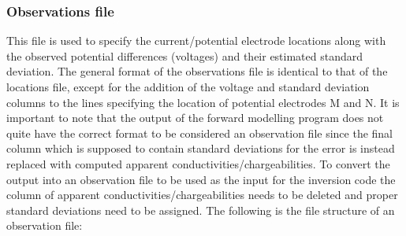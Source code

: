 \subsubsection{Observations file}
This file is used to specify the current/potential electrode locations along with the observed potential differences (voltages) and their estimated standard deviation. The general format of the observations file is identical to that of the locations file, except for the addition of the voltage and standard deviation columns to the lines specifying the location of potential electrodes M and N. It is important to note that the output of the forward modelling program  does not quite have the correct format to be considered an observation file since the final column which is supposed to contain standard deviations for the error is instead replaced with computed apparent conductivities/chargeabilities. To convert the  output into an observation file to be used as the input for the inversion code the column of apparent conductivities/chargeabilities needs to be deleted and proper standard deviations need to be assigned. The following is the file structure of an observation file:
